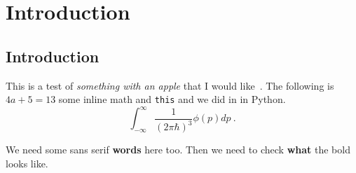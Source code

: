 \graphicspath{{img/chapter_1/}}


\chapter{Introduction}
\label{chapter:introduction}

\section{Introduction}

This is a test of \textit{something with an apple} that I would
like~\cite{Weinberg:1967tq}. The following is $4a + 5 = 13$ some
inline math and \texttt{this} and we did in in \textsf{Python}.
\begin{equation}
  \label{eq:1}
  \int_{-\infty}^{\infty} \frac{1}{(2\pi \hbar)^{3}} \phi(p) dp \ .
\end{equation}

\textsf{We need some sans serif \textbf{words} here too.} Then we need to check
\textbf{what} the bold looks like.

